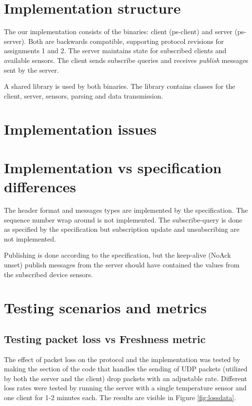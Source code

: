 \documentclass[a4paper]{article}
\begin{document}


\tableofcontents
\newpage

\section{Implementation structure}
The our implementation consists of the binaries: client (ps-client) and server
(ps-server). Both are backwards compatible, supporting protocol revisions for
assignments 1 and 2. The server maintains state for subscribed clients and
available sensors. The client sends subscribe queries and receives \emph{publish}
messages sent by the server.

A shared library is used by both binaries. The library contains classes for
the client, server, sensors, parsing and data transmission.

\section{Implementation issues}

\section{Implementation vs specification differences}
The header format and messages types are implemented by the specification.
The sequence number wrap around is not implemented. The subscribe-query is done
as specified by the specification but subscription update and unsubscribing
are not implemented.

Publishing is done according to the specification, but the keep-alive (NoAck
unset) publish messages from the server should have contained the values from
the subscribed device sensors.


\section{Testing scenarios and metrics}


\subsection{Testing packet loss vs Freshness metric}
The effect of packet loss on the protocol and the implementation was tested by 
making the section of the code that handles the sending of UDP packets (utilized
by both the server and the client) drop packets with an adjustable rate.
Different loss rates were tested by running the server with a single temperature
sensor and one client for 1-2 minutes each. The results are visible in Figure 
\ref{fig:lossdata}.
\end{document}
